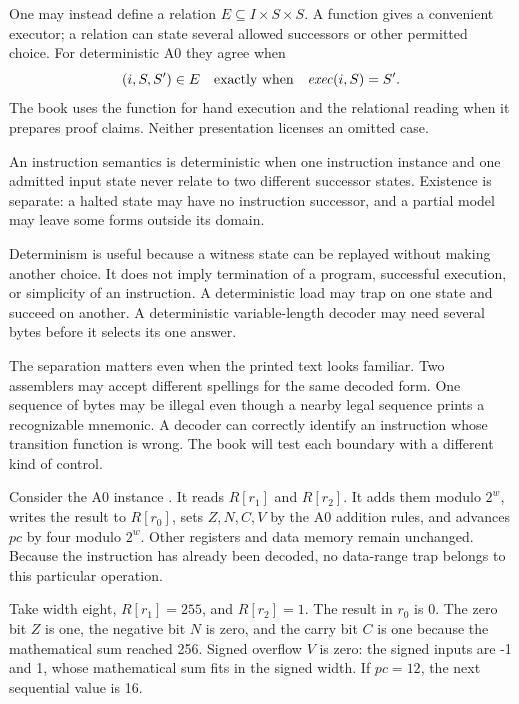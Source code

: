 One may instead define a relation
\(E\subseteq I\mathbin{\times}S\mathbin{\times}S\). A function gives a
convenient executor; a relation can state several allowed successors or other
permitted choice.
For deterministic A0 they agree when
\[
 (i,S,S')\in E \quad\hbox{exactly when}\quad \mathit{exec}(i,S)=S'.
\]
The book uses the function for hand execution and the relational reading when
it prepares proof claims. Neither presentation licenses an omitted case.

\begin{definition}[title={Deterministic instruction semantics}]
An instruction semantics is deterministic when one instruction instance and
one admitted input state never relate to two different successor states.
Existence is separate: a halted state may have no instruction successor, and
a partial model may leave some forms outside its domain.
\end{definition}

Determinism is useful because a witness state can be replayed without making
another choice. It does not imply termination of a program, successful
execution, or simplicity of an instruction. A deterministic load may trap on
one state and succeed on another. A deterministic variable-length decoder may
need several bytes before it selects its one answer.

The separation matters even when the printed text looks familiar. Two
assemblers may accept different spellings for the same decoded form. One
sequence of bytes may be illegal even though a nearby legal sequence prints a
recognizable mnemonic. A decoder can correctly identify an instruction whose
transition function is wrong. The book will test each boundary with a
different kind of control.

Consider the A0 instance . It reads \(R[r_1]\) and
\(R[r_2]\). It adds them modulo \(2^w\), writes the result to \(R[r_0]\), sets
\(Z,N,C,V\) by the A0 addition rules, and advances \(pc\) by four modulo
\(2^w\). Other registers and data memory remain unchanged. Because the
instruction has already been decoded, no data-range trap belongs to this
particular operation.

Take width eight, \(R[r_1]=255\), and \(R[r_2]=1\). The result in \(r_0\) is
0. The zero bit \(Z\) is one, the negative bit \(N\) is zero, and the carry
bit \(C\) is one because the mathematical sum reached 256. Signed overflow
\(V\) is zero: the signed inputs are -1 and 1, whose mathematical sum fits in
the signed width. If \(pc=12\), the next sequential value is 16.

